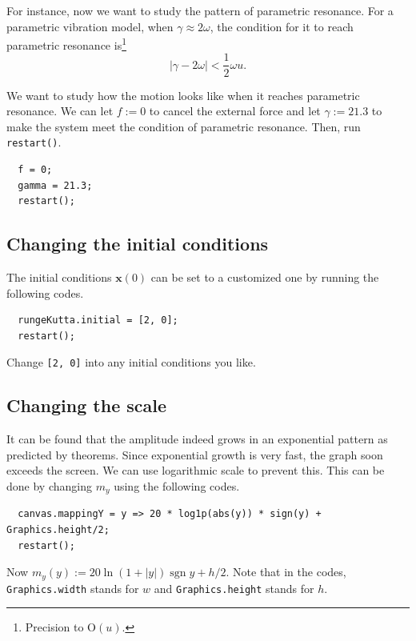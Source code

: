 \documentclass[12pt]{article}
\begin{document}
For instance, now we want to study the pattern of parametric resonance.
For a parametric vibration model, when $\gamma\approx2\omega$,
the condition for it to reach parametric resonance is\footnote{
  Precision to $\mathrm O\left(u\right)$.
} \cite[p. 82]{landau1976mechanics}
\begin{equation}
  \left|\gamma-2\omega\right|<\frac12\omega u.
\end{equation}

We want to study how the motion looks like when it reaches parametric resonance.
We can let $f:=0$ to cancel the external force
and let $\gamma:=21.3$ to make the system meet the condition of parametric resonance.
Then, run \texttt{restart()}.

\begin{verbatim}
  f = 0;
  gamma = 21.3;
  restart();
\end{verbatim}

\subsection{Changing the initial conditions}

The initial conditions $\mathbf x\left(0\right)$ can be set to a customized one
by running the following codes.

\begin{verbatim}
  rungeKutta.initial = [2, 0];
  restart();
\end{verbatim}

Change \texttt{[2, 0]} into any initial conditions you like.

\subsection{Changing the scale}

It can be found that the amplitude indeed grows in an exponential pattern as predicted by theorems.
Since exponential growth is very fast, the graph soon exceeds the screen.
We can use logarithmic scale to prevent this.
This can be done by changing $m_y$ using the following codes.

\begin{verbatim}
  canvas.mappingY = y => 20 * log1p(abs(y)) * sign(y) + Graphics.height/2;
  restart();
\end{verbatim}

Now $m_y\left(y\right):=20\ln\left(1+\left|y\right|\right)\operatorname{sgn}y+h/2$.
Note that in the codes, \texttt{Graphics.width} stands for $w$
and \texttt{Graphics.height} stands for $h$.
\end{document}
